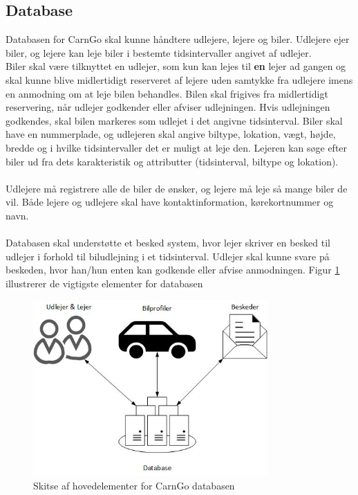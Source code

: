 \documentclass[Rapport/Rapport_main.tex]{subfiles}
\begin{document}
\subsection{Database}
Databasen for CarnGo skal kunne håndtere udlejere, lejere og biler. Udlejere ejer biler, og lejere kan leje biler i bestemte tidsintervaller angivet af udlejer. \\
Biler skal være tilknyttet en udlejer, som kun kan lejes til \textbf{en} lejer ad gangen og skal kunne blive midlertidigt reserveret af lejere uden samtykke fra udlejere imens en anmodning om at leje bilen behandles. Bilen skal frigives fra midlertidigt reservering, når udlejer godkender eller afviser udlejningen. Hvis udlejningen godkendes, skal bilen markeres som udlejet i det angivne tidsinterval. Biler skal have en nummerplade, og udlejeren skal angive biltype, lokation, vægt, højde, bredde og i hvilke tidsintervaller det er muligt at leje den. Lejeren kan søge efter biler ud fra dets karakteristik og attributter (tidsinterval, biltype og lokation). \\\\
Udlejere må registrere alle de biler de ønsker, og lejere må leje så mange biler de vil. Både lejere og udlejere skal have kontaktinformation, kørekortnummer og navn. \\\\
Databasen skal understøtte et besked system, hvor lejer skriver en besked til udlejer i forhold til biludlejning i et tidsinterval. Udlejer skal kunne svare på beskeden, hvor han/hun enten kan godkende eller afvise anmodningen. Figur \ref{fig:dab} illustrerer de vigtigste elementer for databasen
\begin{figure}[H]
    \centering
    \includegraphics[width=0.8\textwidth]{Rapport/Arkitektur/4+1/Logical/graphics/DatabaseIllustration.jpg}
    \caption{Skitse af hovedelementer for CarnGo databasen}
    \label{fig:dab}
\end{figure}
\end{document}
